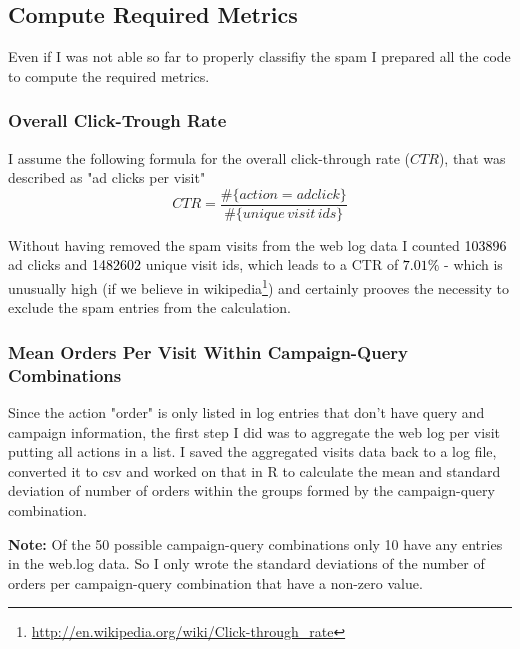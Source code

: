 \documentclass{article}\usepackage[]{graphicx}\usepackage[]{color}
\begin{document}

\subsection{Compute Required Metrics} %
\label{sub:compute_metrics}

Even if I was not able so far to properly classifiy the spam I prepared all the code to compute the required metrics.

\subsubsection{Overall Click-Trough Rate} %
\label{subsub:ctr}

I assume the following formula for the overall click-through rate ($CTR$), that was described as "ad clicks per visit"
$$
CTR = \frac{ \#\{action=adclick\} }{ \#\{unique \, visit \, ids\}}
$$

Without having removed the spam visits from the web log data I counted \textcolor{black}{103896} ad clicks and \textcolor{black}{1482602} unique visit ids, which leads to a CTR of \textcolor{black}{$7.01\%$} - which is unusually high (if we believe in wikipedia\footnote{\url{http://en.wikipedia.org/wiki/Click-through_rate}}) and certainly prooves the necessity to exclude the spam entries from the calculation.




\subsubsection{Mean Orders Per Visit Within Campaign-Query Combinations} %
\label{subsub:mean_cq}
Since the action "order" is only listed in log entries that don't have query and campaign information, the first step I did was to aggregate the web log per visit 
putting all actions in a list.
I saved the aggregated visits data back to a log file, converted it to csv and worked on that in R to calculate the mean and standard deviation of number of orders within the groups formed by the campaign-query combination.

\textbf{Note:} Of the 50 possible campaign-query combinations only 10 have any entries in the web.log data. So I only wrote the standard deviations of the number of orders per campaign-query combination that have a non-zero value. 
\end{document}
